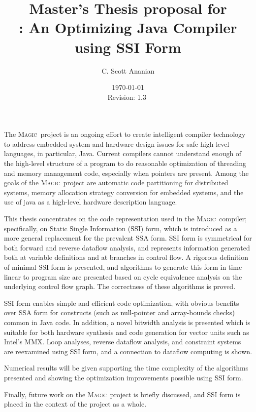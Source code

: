 \documentclass[12pt,notitlepage,twocolumn,twoside]{article}
\title{{\large Master's Thesis proposal for}\\
\magic: An Optimizing Java Compiler using SSI Form}
\author{C. Scott Ananian}
\date{\today \\ $ $Revision: 1.3 $ $}
\newcommand{\magic}{\textsc{Magic}}
\begin{document}
\pagestyle{myheadings}

\maketitle

The \magic\ project is an ongoing effort to create intelligent
compiler technology to address embedded system and hardware design
issues for safe high-level languages, in particular, Java.
Current compilers cannot understand enough of the high-level structure
of a program to do reasonable optimization of threading and memory
management code, especially when pointers are present. Among the goals
of the \magic\ project are automatic code partitioning for distributed
systems, memory allocation strategy conversion for embedded systems,
and the use of java as a high-level hardware description language.

This thesis concentrates on the code representation used in the
\magic\ compiler; specifically, on Static Single Information (SSI)
form, which is introduced as a more general replacement for the
prevalent SSA form.  SSI form is symmetrical for both forward and
reverse dataflow analysis, and represents information generated both
at variable definitions and at branches in control flow.  A rigorous
definition of minimal SSI form is presented, and algorithms to
generate this form in time linear to program size are
presented based on cycle equivalence analysis on the underlying
control flow graph.  The correctness of these algorithms is proved.

SSI form enables simple and efficient code optimization, with obvious
benefits over SSA form for constructs (such as null-pointer and
array-bounds checks) common in Java code.  In addition, a novel
bitwidth analysis is presented which is suitable for both hardware
synthesis and code generation for vector units such as Intel's MMX.
Loop analyses, reverse dataflow analysis, and constraint systems are
reexamined using SSI form, and a connection to dataflow computing is
shown.

Numerical results will be given supporting the time complexity of the
algorithms presented and showing the optimization improvements
possible using SSI form.

Finally, future work on the \magic\ project is briefly discussed, and
SSI form is placed in the context of the project as a whole.
\end{document}
